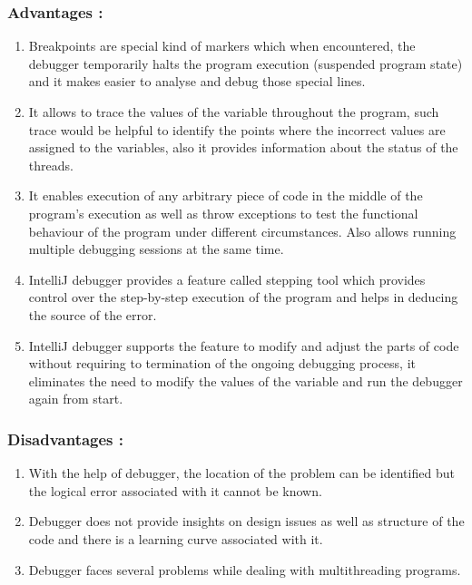 \documentclass[12pt, a4paper]{article}
\begin{document}
\subsubsection{Advantages : }
\begin{enumerate}
	\item Breakpoints are special kind of markers which when encountered, the debugger temporarily halts the program execution (suspended program state) and it makes easier to analyse and debug those special lines.
	\item It allows to trace the values of the variable throughout the program, such trace would be helpful to identify the points where the incorrect values are assigned to the variables, also it provides information about the status of the threads.
	\item It enables execution of any arbitrary piece of code in the middle of the program's execution as well as throw exceptions to test the functional behaviour of the program under different circumstances. Also allows running multiple debugging sessions at the same time.
	\item IntelliJ debugger provides a feature called stepping tool which provides control over the step-by-step execution of the program and helps in deducing the source of the error.
	\item IntelliJ debugger supports the feature to modify and adjust the parts of code without requiring to termination of the ongoing debugging process, it eliminates the need to modify the values of the variable and run the debugger again from start.
\end{enumerate}

\subsubsection{Disadvantages : }
\begin{enumerate}
	\item With the help of debugger, the location of the problem can be identified but the logical error associated with it cannot be known.
	\item Debugger does not provide insights on design issues as well as structure of the code and there is a learning curve associated with it.
	\item Debugger faces several problems while dealing with multithreading programs. 
\end{enumerate}

\newpage
\end{document}
